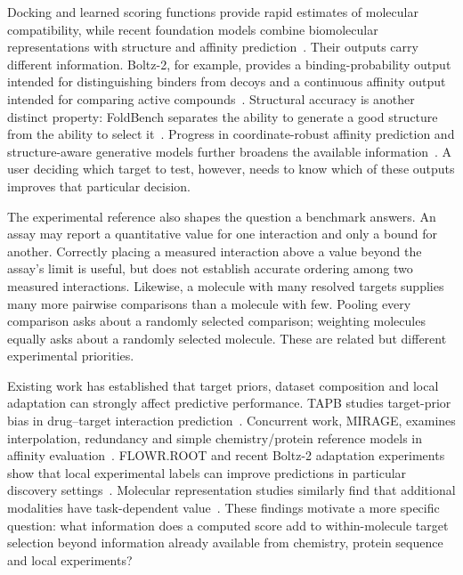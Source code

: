 \documentclass[pdflatex, sn-nature]{sn-jnl}
\begin{document}
Docking and learned scoring functions provide rapid estimates of molecular compatibility, while recent foundation models combine biomolecular representations with structure and affinity prediction~\cite{trott2010vina,mcnutt2021gnina,passaro2025boltz2,shenoy2026nesso}. Their outputs carry different information. Boltz-2, for example, provides a binding-probability output intended for distinguishing binders from decoys and a continuous affinity output intended for comparing active compounds~\cite{boltzdocs}. Structural accuracy is another distinct property: FoldBench separates the ability to generate a good structure from the ability to select it~\cite{xu2025foldbench}. Progress in coordinate-robust affinity prediction and structure-aware generative models further broadens the available information~\cite{liu2026ecloudbind,cremer2026flowrroot}. A user deciding which target to test, however, needs to know which of these outputs improves that particular decision.

The experimental reference also shapes the question a benchmark answers. An assay may report a quantitative value for one interaction and only a bound for another. Correctly placing a measured interaction above a value beyond the assay's limit is useful, but does not establish accurate ordering among two measured interactions. Likewise, a molecule with many resolved targets supplies many more pairwise comparisons than a molecule with few. Pooling every comparison asks about a randomly selected comparison; weighting molecules equally asks about a randomly selected molecule. These are related but different experimental priorities.

Existing work has established that target priors, dataset composition and local adaptation can strongly affect predictive performance. TAPB studies target-prior bias in drug--target interaction prediction~\cite{lin2025tapb}. Concurrent work, MIRAGE, examines interpolation, redundancy and simple chemistry/protein reference models in affinity evaluation~\cite{yazdani2026mirage}. FLOWR.ROOT and recent Boltz-2 adaptation experiments show that local experimental labels can improve predictions in particular discovery settings~\cite{cremer2026flowrroot,furui2026boltzadaptation}. Molecular representation studies similarly find that additional modalities have task-dependent value~\cite{martinezgalindo2026multimodality,cui2026aca}. These findings motivate a more specific question: what information does a computed score add to within-molecule target selection beyond information already available from chemistry, protein sequence and local experiments?
\end{document}

